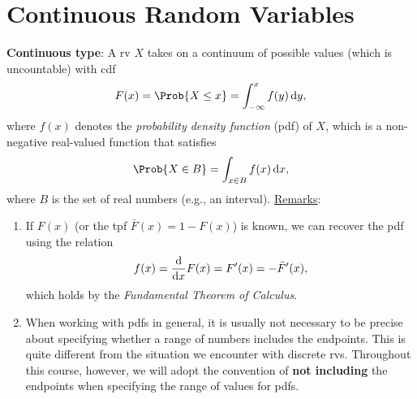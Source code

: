 \section*{Continuous Random Variables}
\begin{Regular}
    \textbf{Continuous type}: A rv $ X $ takes on a continuum of possible values (which is uncountable) with cdf
    \[ F(x)=\Prob{X\le x}=\int_{-\infty}^{x}f(y)\odif{y}, \]
    where $ f(x) $ denotes the \emph{probability density function} (pdf) of $ X $, which is a non-negative real-valued function that satisfies
    \[ \Prob{X\in B}=\int_{x\in B}f(x)\odif{x},  \]
    where $ B $ is the set of real numbers (e.g., an interval).
    \tcblower{}
    \underline{Remarks}:
    \begin{enumerate}[(1)]
        \item If $ F(x) $ (or the tpf $ \bar{F}(x)=1-F(x) $) is known, we can recover the pdf using the relation
              \[ f(x)=\odv*{F(x)}{x}=F^\prime(x)=-\bar{F}^\prime(x), \]
              which holds by the \emph{Fundamental Theorem of Calculus}.
        \item When working with pdfs in general, it is usually not necessary to be precise about
              specifying whether a range of numbers includes the endpoints. This is quite
              different from the situation we encounter with discrete rvs. Throughout this course,
              however, we will adopt the convention of \textbf{not including} the endpoints when specifying
              the range of values for pdfs.
    \end{enumerate}
\end{Regular}
